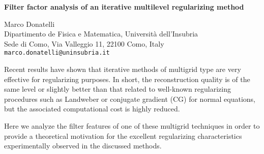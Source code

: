 \documentclass{report}
\begin{document}

\begin{center}
{\large
{\bf Filter factor analysis of an iterative multilevel regularizing method}}

	Marco Donatelli \\
	Dipartimento de Fisica e Matematica,
	Universit\`a dell'Insubria \\
	Sede di Como, Via Valleggio 11, 22100 Como, Italy \\
	{\tt marco.donatelli@uninsubria.it}
\end{center}
Recent results have shown that iterative methods of multigrid
type are very effective for regularizing purposes.
In short, the reconstruction quality is of the same level
or slightly better than that related to well-known
regularizing procedures such as Landweber or conjugate
gradient (CG) for normal equations, but the associated
computational cost is highly reduced.

Here we analyze the filter features of one of these
multigrid techniques in order to provide a theoretical
motivation for the excellent regularizing characteristics
experimentally observed in the discussed methods.


\end{document}

